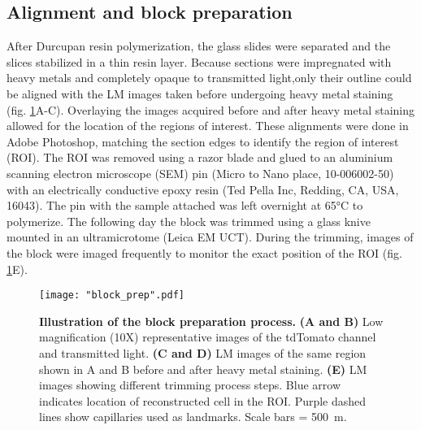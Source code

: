 \subsection{Alignment and block preparation}
\label{sec:block prep}
After Durcupan resin polymerization, the glass slides were separated and the slices stabilized in a thin resin layer. Because sections were impregnated with heavy metals and completely opaque to transmitted light,only their outline could be aligned with the LM images taken before undergoing heavy metal staining (fig. \ref{fig:block_prep}A-C). Overlaying the images acquired before and after heavy metal staining allowed for the location of the regions of interest. These alignments were done in Adobe Photoshop, matching the section edges to identify the region of interest (ROI). The ROI was removed using a razor blade and glued to an aluminium scanning electron microscope (SEM) pin (Micro to Nano place, 10-006002-50) with an electrically conductive epoxy resin (Ted Pella Inc, Redding, CA, USA, 16043). The pin with the sample attached was left overnight at 65°C to polymerize. The following day the block was trimmed using a glass knive mounted in an ultramicrotome (Leica EM UCT). During the trimming, images of the block were imaged frequently to monitor the exact position of the ROI (fig. \ref{fig:block_prep}E).
\begin{figure}[!b]
	\captionsetup[figure]{indentation=0pt}
	\texttt{[image: "block\_prep".pdf]}
	\caption{\textbf{Illustration of the block preparation process.} \textbf{(A and B)} Low magnification (10X) representative images of the tdTomato channel and transmitted light. \textbf{(C and D)} LM images of the same region shown in A and B before and after heavy metal staining. \textbf{(E)} LM images showing different trimming process steps. Blue arrow indicates location of reconstructed cell in the ROI. Purple dashed lines show capillaries used as landmarks. Scale bars = 500~\textmu m.}
	\label{fig:block_prep}
\end{figure} 
